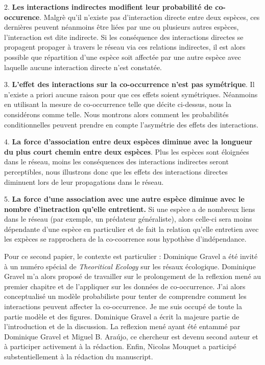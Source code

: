 2. \textbf{Les interactions indirectes modifient leur probabilité de co-occurence}. Malgrè qu'il n'existe pas d'interaction directe entre deux espèces, ces dernières peuvent néanmoins être liées par une ou plusieurs autres espèces, l'interaction est dite indirecte. Si les conséquence des interactions directes se propagent propager à travers le réseau via ces relations indirectes, il est alors possible que répartition d'une espèce soit affectée par une autre espèce avec laquelle aucune interaction directe n'est constatée.

3. \textbf{L'effet des interactions sur la co-occurrence n'est pas symétrique}. Il n'existe a priori aucune raison pour que ces effets soient symétriques. Néanmoins en utilisant la mesure de co-occurrence telle que décite ci-dessus, nous la considérons comme telle. Nous montrons alors comment les probabilités conditionnelles peuvent prendre en compte l'asymétrie des effets des interactions.

4. \textbf{La force d'association entre deux espèces diminue avec la longueur du plus court chemin entre deux espèces}. Plus les espèces sont éloignées dans le réseau, moins les conséquences des interactions indirectes seront perceptibles, nous illustrons donc que les effets des interactions directes diminuent lors de leur propagations dans le réseau.

5. \textbf{La force d'une association avec une autre espèce diminue avec le nombre d'inetraction qu'elle entretient.} Si une espèce a de nombreux liens dans le réseau (par exemple, un prédateur généraliste), alors celle-ci sera moins dépendante d'une espèce en particulier et de fait la relation qu'elle entretien avec les expèces se rapprochera de la co-coorrence sous hypothèse d'indépendance.


Pour ce second papier, le contexte est particulier : Dominique Gravel a été invité à un numéro spécial de \textit{Theoritical Ecology} sur les résaux écologique. Dominique Gravel m'a alors proposé de travailler sur le prolongement de la reflexion mené au premier chapitre et de l'appliquer sur les données de co-occurrence. J'ai alors conceptualisé un modèle probabiliste pour tenter de comprendre comment les interactions peuvent affecter la co-occurrence. Je me suis occupé de toute la partie modèle et des figures. Dominique Gravel a écrit la majeure partie de l'introduction et de la discussion. La reflexion mené ayant été entammé par Dominique Gravel et  Miguel B. Ara\'ujo, ce chercheur est devenu second auteur et à participer activement à la rédaction. Enfin, Nicolas Mouquet a participé substentiellement à la rédaction du manuscript.



